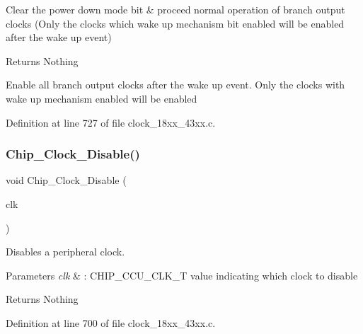 Clear the power down mode bit \& proceed normal operation of branch output clocks (Only the clocks which wake up mechanism bit enabled will be enabled after the wake up event) 

\begin{DoxyReturn}{Returns}
Nothing
\end{DoxyReturn}
Enable all branch output clocks after the wake up event. Only the clocks with wake up mechanism enabled will be enabled 

Definition at line 727 of file clock\+\_\+18xx\+\_\+43xx.\+c.

\mbox{\label{group___c_l_o_c_k__18_x_x__43_x_x_ga847e7bcd709e030752213380e78039ec}} 
\subsubsection{\texorpdfstring{Chip\+\_\+\+Clock\+\_\+\+Disable()}{Chip\_Clock\_Disable()}}
{\footnotesize\ttfamily void Chip\+\_\+\+Clock\+\_\+\+Disable (\begin{DoxyParamCaption}\item[{\hyperlink{chip__clocks_8h_a45bb23228b9831321626c103ada7c60b}{C\+H\+I\+P\+\_\+\+C\+C\+U\+\_\+\+C\+L\+K\+\_\+T}}]{clk }\end{DoxyParamCaption})}



Disables a peripheral clock. 


\begin{DoxyParams}{Parameters}
{\em clk} & \+: C\+H\+I\+P\+\_\+\+C\+C\+U\+\_\+\+C\+L\+K\+\_\+T value indicating which clock to disable \\
\hline
\end{DoxyParams}
\begin{DoxyReturn}{Returns}
Nothing 
\end{DoxyReturn}


Definition at line 700 of file clock\+\_\+18xx\+\_\+43xx.\+c.

\mbox{\label{group___c_l_o_c_k__18_x_x__43_x_x_gaca76aa951b9e6a69a9ef4fb2aea2aaac}} 
